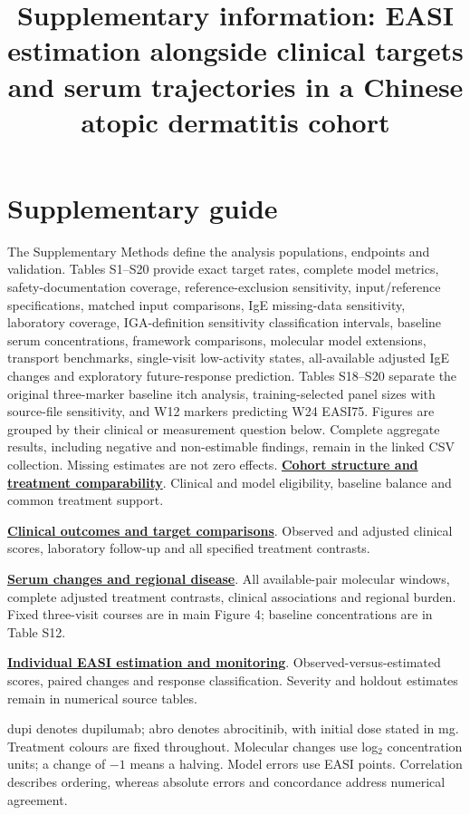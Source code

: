 \documentclass[10pt,a4paper]{article}
\title{Supplementary information: EASI estimation alongside clinical targets and serum trajectories in a Chinese atopic dermatitis cohort}
\author{}
\date{}
\begin{document}
\maketitle
\renewcommand{\thetable}{S\arabic{table}}
\renewcommand{\theHtable}{S.\arabic{table}}
\section*{Supplementary guide}
The Supplementary Methods define the analysis populations, endpoints and validation. Tables S1--S20 provide exact target rates, complete model metrics, safety-documentation coverage, reference-exclusion sensitivity, input/reference specifications, matched input comparisons, IgE missing-data sensitivity, laboratory coverage, IGA-definition sensitivity classification intervals, baseline serum concentrations, framework comparisons, molecular model extensions, transport benchmarks, single-visit low-activity states, all-available adjusted IgE changes and exploratory future-response prediction. Tables S18--S20 separate the original three-marker baseline itch analysis, training-selected panel sizes with source-file sensitivity, and W12 markers predicting W24 EASI75. Figures are grouped by their clinical or measurement question below. Complete aggregate results, including negative and non-estimable findings, remain in the linked CSV collection. Missing estimates are not zero effects.
\hyperref[fig:FigureS1]{\textbf{Cohort structure and treatment comparability}}. Clinical and model eligibility, baseline balance and common treatment support.\par
\hyperref[fig:FigureS3]{\textbf{Clinical outcomes and target comparisons}}. Observed and adjusted clinical scores, laboratory follow-up and all specified treatment contrasts.\par
\hyperref[fig:FigureS11]{\textbf{Serum changes and regional disease}}. All available-pair molecular windows, complete adjusted treatment contrasts, clinical associations and regional burden. Fixed three-visit courses are in main Figure 4; baseline concentrations are in Table S12.\par
\hyperref[fig:FigureS19]{\textbf{Individual EASI estimation and monitoring}}. Observed-versus-estimated scores, paired changes and response classification. Severity and holdout estimates remain in numerical source tables.\par
dupi denotes dupilumab; abro denotes abrocitinib, with initial dose stated in mg. Treatment colours are fixed throughout. Molecular changes use log$_2$ concentration units; a change of $-1$ means a halving. Model errors use EASI points. Correlation describes ordering, whereas absolute errors and concordance address numerical agreement.
\clearpage
\end{document}
